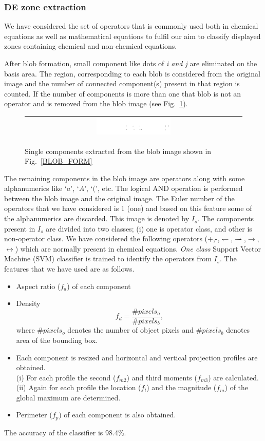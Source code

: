 \documentclass[conference]{IEEEtran}
\begin{document}
\subsubsection{DE zone extraction}
We have considered the set of operators that is commonly used both in chemical  equations as well as mathematical equations to fulfil our aim to classify displayed  zones containing chemical and non-chemical equations.

After blob formation, small component like dots of \emph{i and j} are  eliminated on the basis area. The region, corresponding to each blob  is considered from the original image and the number of connected component(s) present in that region is counted. If the number of components is more than one that blob is not an operator and is removed from the blob image (see Fig.~\ref{single_com}).
\begin{figure}[h]\center\footnotesize
\begin{tabular}{|c|}
\hline
 \includegraphics[width=0.35\textwidth]{singlechar.png} \\
 \hline
 \end{tabular}
   \caption{Single components extracted from the blob image shown in Fig.~\ref{BLOB_FORM}}
 \label{single_com}
\end{figure}
The remaining components in the blob image are operators along with some alphanumerics like $‘a’$, $‘A’$, $‘(’$, etc. The logical AND operation is performed 
between the blob image and the original image. The Euler number of the operators  that we have considered is 1 (one) and based on this feature some of the alphanumerics are discarded. This image is denoted by  $I_s$. The components present in $I_s$ are divided into two classes; (i) one is operator class, and other is  non-operator class. We have considered the following operators (+,-,$\leftharpoondown$,$\rightharpoonup$,$\rightarrow$,$\leftrightarrow$) which are normally present in  chemical equations. \emph{One class} Support Vector Machine (SVM) classifier is trained to identify the operators from $I_s$. The features that we have used are as follows.
\begin{itemize}
 \item Aspect ratio ($f_a$) of each component
 \item 
 Density \[f_d   = \frac{\#pixels_o} {\#pixels_b}, \]
 where $\#pixels_o$ denotes the number of object pixels and $\#pixels_b$ denotes area of the bounding box.
 \item Each component is resized and horizontal and vertical projection profiles   are obtained.\\
 (i) For each profile the second ($f_{m2}$) and third moments ($f_{m3}$) are calculated. \\
 (ii) Again for each profile the location ($f_l$) and the magnitude ($f_m$) of the global maximum are determined.
 \item Perimeter ($f_p$)  of each component is also obtained.
\end{itemize}
The accuracy of the classifier is 98.4\%.
\end{document}
